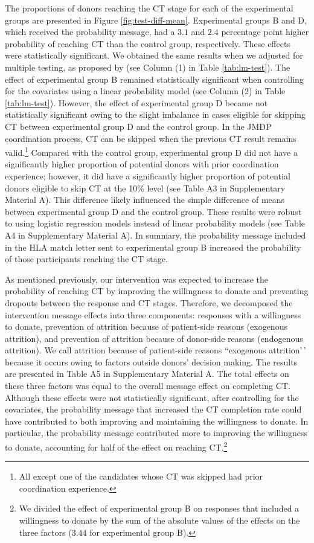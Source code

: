 \documentclass[12pt, a4paper]{article}
\begin{document}
The proportions of donors reaching the CT stage for each of the experimental groups are presented in Figure \ref{fig:test-diff-mean}. Experimental groups B and D, which received the probability message, had a \(3.1\) and \(2.4\) percentage point higher probability of reaching CT than the control group, respectively. These effects were statistically significant. We obtained the same results when we adjusted for multiple testing, as proposed by \citet{List2019} (see Column (1) in Table \ref{tab:lm-test}). The effect of experimental group B remained statistically significant when controlling for the covariates using a linear probability model (see Column (2) in Table \ref{tab:lm-test}). However, the effect of experimental group D became not statistically significant owing to the slight imbalance in cases eligible for skipping CT between experimental group D and the control group. In the JMDP coordination process, CT can be skipped when the previous CT result remains valid.\footnote{All except one of the candidates whose CT was skipped had prior coordination experience.} Compared with the control group, experimental group D did not have a significantly higher proportion of potential donors with prior coordination experience; however, it did have a significantly higher proportion of potential donors eligible to skip CT at the 10\% level (see Table A3 in Supplementary Material A). This difference likely influenced the simple difference of means between experimental group D and the control group. These results were robust to using logistic regression models instead of linear probability models (see Table A4 in Supplementary Material A). In summary, the probability message included in the HLA match letter sent to experimental group B increased the probability of those participants reaching the CT stage.

As mentioned previously, our intervention was expected to increase the probability of reaching CT by improving the willingness to donate and preventing dropouts between the response and CT stages. Therefore, we decomposed the intervention message effects into three components: responses with a willingness to donate, prevention of attrition because of patient-side reasons (exogenous attrition), and prevention of attrition because of donor-side reasons (endogenous attrition). We call attrition because of patient-side reasons ``exogenous attrition'\,' because it occurs owing to factors outside donors' decision making. The results are presented in Table A5 in Supplementary Material A. The total effects on these three factors was equal to the overall message effect on completing CT. Although these effects were not statistically significant, after controlling for the covariates, the probability message that increased the CT completion rate could have contributed to both improving and maintaining the willingness to donate. In particular, the probability message contributed more to improving the willingness to donate, accounting for half of the effect on reaching CT.\footnote{We divided the effect of experimental group B on responses that included a willingness to donate by the sum of the absolute values of the effects on the three factors (\(3.44\) for experimental group B).}
\end{document}
